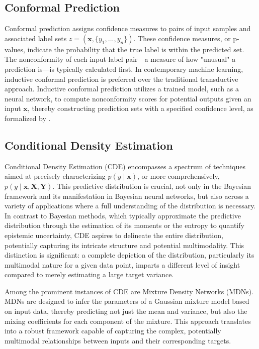 \documentclass{article}
\begin{document}
\subsection{Conformal Prediction}
Conformal prediction assigns confidence measures to pairs of input samples and associated label sets $z = (\mathbf{x}, \{y_1, ..., y_n\})$. These confidence measures, or p-values, indicate the probability that the true label is within the predicted set. The nonconformity of each input-label pair—a measure of how "unusual" a prediction is—is typically calculated first. In contemporary machine learning, inductive conformal prediction is preferred over the traditional transductive approach. Inductive conformal prediction utilizes a trained model, such as a neural network, to compute nonconformity scores for potential outputs given an input $\mathbf{x}$, thereby constructing prediction sets with a specified confidence level, as formalized by \cite{Papadopoulos08}.

\subsection{Conditional Density Estimation}
Conditional Density Estimation (CDE) encompasses a spectrum of techniques aimed at precisely characterizing $p(y \mid \mathbf{x})$, or more comprehensively, $p(y \mid \mathbf{x}, \mathbf{X}, \mathbf{Y})$. This predictive distribution is crucial, not only in the Bayesian framework and its manifestation in Bayesian neural networks, but also across a variety of applications where a full understanding of the distribution is necessary. In contrast to Bayesian methods, which typically approximate the predictive distribution through the estimation of its moments or the entropy to quantify epistemic uncertainty, CDE aspires to delineate the entire distribution, potentially capturing its intricate structure and potential multimodality. This distinction is significant: a complete depiction of the distribution, particularly its multimodal nature for a given data point, imparts a different level of insight compared to merely estimating a large target variance.

Among the prominent instances of CDE are Mixture Density Networks (MDNs). MDNs are designed to infer the parameters of a Gaussian mixture model based on input data, thereby predicting not just the mean and variance, but also the mixing coefficients for each component of the mixture. This approach translates into a robust framework capable of capturing the complex, potentially multimodal relationships between inputs and their corresponding targets.
\end{document}
